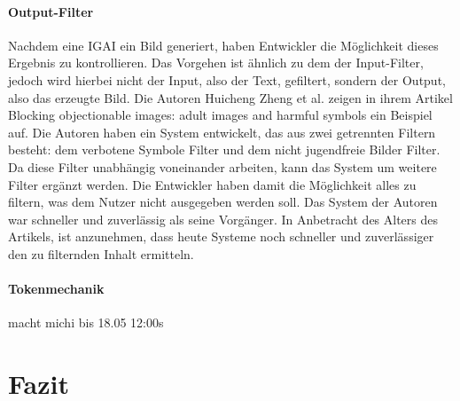 \documentclass[12pt]{article}
\begin{document}
\subsubsection{Output-Filter}
Nachdem eine IGAI ein Bild generiert, haben Entwickler die Möglichkeit dieses Ergebnis zu kontrollieren. Das Vorgehen ist ähnlich zu dem der Input-Filter, jedoch wird hierbei nicht der Input, also der Text, gefiltert, sondern der Output, also das erzeugte Bild. Die Autoren Huicheng Zheng et al. zeigen in ihrem Artikel Blocking objectionable images: adult images and harmful symbols ein Beispiel auf. Die Autoren haben ein System entwickelt, das aus zwei getrennten Filtern besteht: dem verbotene Symbole Filter und dem nicht jugendfreie Bilder Filter. Da diese Filter unabhängig voneinander arbeiten, kann das System um weitere Filter ergänzt werden. Die Entwickler haben damit die Möglichkeit alles zu filtern, was dem Nutzer nicht ausgegeben werden soll. Das System der Autoren war schneller und zuverlässig als seine Vorgänger. In Anbetracht des Alters des Artikels, ist anzunehmen, dass heute Systeme noch schneller und zuverlässiger den zu filternden Inhalt ermitteln.
\subsubsection{Tokenmechanik}
macht michi bis 18.05 12:00s

\chapter{Fazit}


\end{document}

